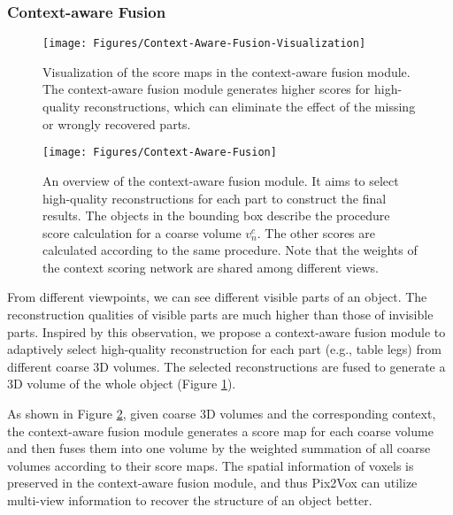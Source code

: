 \documentclass[10pt,twocolumn,letterpaper]{article}
\begin{document}
\vspace{-3 mm}
\subsubsection{Context-aware Fusion}
\vspace{-1 mm}

\begin{figure}[!t]
  \centering
  \resizebox{\linewidth}{!} {
    \texttt{[image: Figures/Context-Aware-Fusion-Visualization]}
  }
  \caption{Visualization of the score maps in the context-aware fusion module. The context-aware fusion module generates higher scores for high-quality reconstructions, which can eliminate the effect of the missing or wrongly recovered parts.}
  \label{fig:context-aware-fusion-visualization}
\end{figure}

\begin{figure}
  \centering
  \resizebox{\linewidth}{!} {
    \texttt{[image: Figures/Context-Aware-Fusion]}
  }
  \caption{An overview of the context-aware fusion module. It aims to select high-quality reconstructions for each part to construct the final results. The objects in the bounding box describe the procedure score calculation for a coarse volume $v^c_n$. The other scores are calculated according to the same procedure. Note that the weights of the context scoring network are shared among different views.}
  \label{fig:context-aware-fusion}
  \vspace{-2 mm}
\end{figure}

From different viewpoints, we can see different visible parts of an object.
The reconstruction qualities of visible parts are much higher than those of invisible parts.
Inspired by this observation, we propose a context-aware fusion module to adaptively select high-quality reconstruction for each part (e.g., table legs) from different coarse 3D volumes.
The selected reconstructions are fused to generate a 3D volume of the whole object (Figure \ref{fig:context-aware-fusion-visualization}).

As shown in Figure \ref{fig:context-aware-fusion}, given coarse 3D volumes and the corresponding context, the context-aware fusion module generates a score map for each coarse volume and then fuses them into one volume by the weighted summation of all coarse volumes according to their score maps.
The spatial information of voxels is preserved in the context-aware fusion module, and thus Pix2Vox can utilize multi-view information to recover the structure of an object better.
\end{document}
